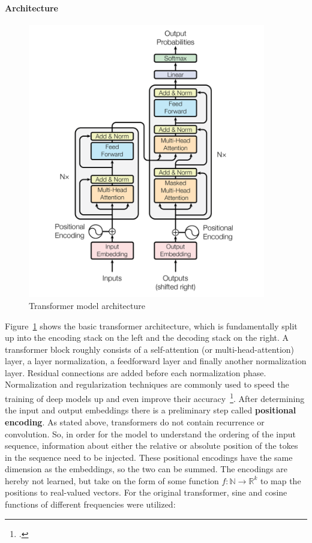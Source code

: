\paragraph{Architecture}
\begin{figure}[h]
  	\includegraphics[height=12cm]{img/transformer}
  	\caption{Transformer model architecture}
	\label{fig:transformer}
\end{figure}
Figure~\ref{fig:transformer} shows the basic transformer architecture, which is fundamentally split up into the encoding stack on the left and the decoding stack on the right. A transformer block roughly consists of a self-attention (or multi-head-attention) layer, a layer normalization, a feedforward layer and finally another normalization layer. Residual connections are added before each normalization phase. Normalization and regularization techniques are commonly used to speed the training of deep models up and even improve their accuracy~\footcite{DBLP:journals/corr/abs-1903-00925}. After determining the input and output embeddings there is a preliminary step called \textbf{positional encoding}. As stated above, transformers do not contain recurrence or convolution. So, in order for the model to understand the ordering of the input sequence, information about either the relative or absolute position of the tokes in the sequence need to be injected. These positional encodings have the same dimension as the embeddings, so the two can be summed. The encodings are hereby not learned, but take on the form of some function $ f: \mathbb{N} \rightarrow \mathbb{R}^k $ to map the positions to real-valued vectors. For the original transformer, sine and cosine functions of different frequencies were utilized:
